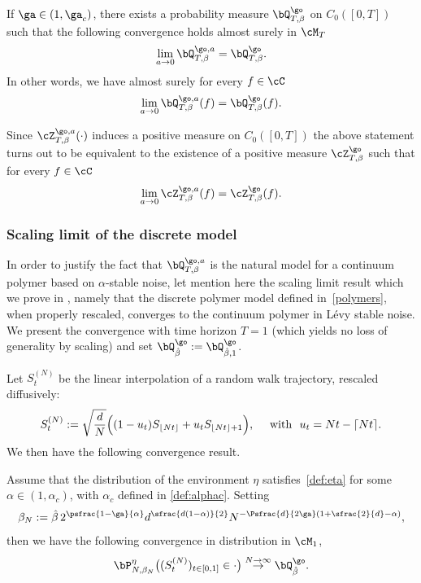 \begin{theorem}\label{thm:contmeasure}
If $\ga\in (1,\ga_c)$, there exists a probability measure
$\bQ^{\go}_{T,\beta}$ on $C_0([0,T])$ such that
the following convergence holds almost surely in $\cM_T$
\[
\lim_{a\to 0} \bQ^{\go,a}_{T,\beta}= \bQ^{\go}_{T,\beta}.
\]
In other words, we have almost surely for every $f\in \cC$
\begin{equation}
\lim_{a\to 0} \bQ^{\go,a}_{T,\beta}(f)= \bQ^{\go}_{T,\beta}(f).
\end{equation}
\end{theorem}
Since
$\cZ^{\go,a }_{T, \beta}(\cdot)$ induces a positive measure on $C_0([0,T])$ the above statement turns out to be equivalent to the existence of a positive measure $\cZ^{\go}_{T, \beta}$ such that for every $f\in \cC$
\begin{equation}
\lim_{a \to 0}\cZ^{\go,a }_{T, \beta}(f)=\cZ^{\go}_{T, \beta}(f).
\end{equation}

\subsubsection{Scaling limit of the discrete model}

In order to justify the fact that $\bQ^{\go,a}_{T,\beta}$ is the natural model for a continuum polymer based on $\alpha$-stable noise, let mention here the scaling limit result which we prove in \cite{BL20_disc},
namely that the discrete polymer model defined in~\eqref{polymers},
when properly rescaled, converges to the continuum
polymer in Lévy stable noise.
We present the convergence with time horizon $T=1$ (which yields no loss of generality by scaling) and set $\bQ^{\go }_{ \hat \beta}:= \bQ^{\go }_{ \hat \beta,1}$.

Let $S_t^{(N)}$ be the linear interpolation
of a random walk trajectory, rescaled diffusively:\vspace*{-3pt}\enlargethispage{\baselineskip}%
\begin{equation}\label{defsn}
S^{(N)}_t:= \sqrt{\frac{d}{N}} \Bigl((1-u_t) S_{\lfloor Nt \rfloor} +u_t S_{\lfloor Nt \rfloor+1} \Bigr),
\quad \text{ with } \ u_t= Nt-\lceil N t \rceil.
\end{equation}
We then have the following convergence result.

\begin{theorema}
\label{thm:conv}
Assume that the distribution of the environment $\eta$ satisfies~\eqref{def:eta} for some $\alpha\in (1,\alpha_c)$, with $\alpha_c$ defined in \eqref{def:alphac}.
Setting
\begin{equation}\label{scalechoice}
\beta_N:= \hat \beta\, 2^{\psfrac{1-\ga}{\alpha}} d^{\sfrac{d(1-\alpha)}{2}} N^{- \Psfrac{d}{2\ga} (1+ \sfrac{2}{d}-\alpha) },
\end{equation}
then we have the following convergence in distribution in $\cM_1$,
\begin{equation}
\bP^{\eta}_{N,\beta_N}\bigl((S^{(N)}_t)_{t\in [0,1]} \in \cdot \bigr) \stackrel{N\to \infty}\to \bQ^{\go }_{ \hat \beta}.
\end{equation}
\end{theorema}

